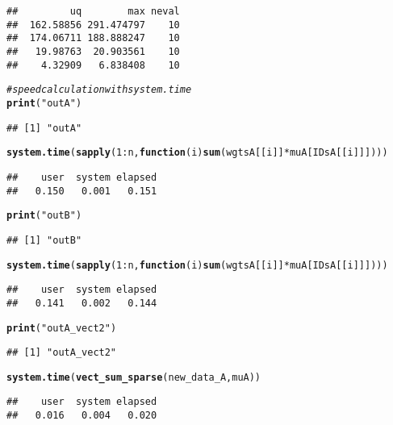 \documentclass{llncs}\usepackage[]{graphicx}\usepackage[]{color}
\makeatletter
\newcommand{\hlnum}[1]{\textcolor[rgb]{0.686,0.059,0.569}{#1}}%
\newcommand{\hlstr}[1]{\textcolor[rgb]{0.192,0.494,0.8}{#1}}%
\newcommand{\hlcom}[1]{\textcolor[rgb]{0.678,0.584,0.686}{\textit{#1}}}%
\newcommand{\hlopt}[1]{\textcolor[rgb]{0,0,0}{#1}}%
\newcommand{\hlstd}[1]{\textcolor[rgb]{0.345,0.345,0.345}{#1}}%
\newcommand{\hlkwa}[1]{\textcolor[rgb]{0.161,0.373,0.58}{\textbf{#1}}}%
\newcommand{\hlkwc}[1]{\textcolor[rgb]{0.333,0.667,0.333}{#1}}%
\newcommand{\hlkwd}[1]{\textcolor[rgb]{0.737,0.353,0.396}{\textbf{#1}}}%
\newenvironment{kframe}{%
 \def\at@end@of@kframe{}%
 \ifinner\ifhmode%
  \def\at@end@of@kframe{\end{minipage}}%
  \begin{minipage}{\columnwidth}%
 \fi\fi%
 \def\FrameCommand##1{\hskip\@totalleftmargin \hskip-\fboxsep
 \colorbox{shadecolor}{##1}\hskip-\fboxsep
     \hskip-\linewidth \hskip-\@totalleftmargin \hskip\columnwidth}%
 \MakeFramed {\advance\hsize-\width
   \@totalleftmargin\z@ \linewidth\hsize
   \@setminipage}}%
 {\par\unskip\endMakeFramed%
 \at@end@of@kframe}
\newenvironment{knitrout}{}{} %
\makeatother
\begin{document}
\begin{knitrout}
\begin{kframe}
\begin{lstlisting}[basicstyle=\ttfamily,breaklines=true]
##         uq        max neval
##  162.58856 291.474797    10
##  174.06711 188.888247    10
##   19.98763  20.903561    10
##    4.32909   6.838408    10
\end{lstlisting}
\begin{alltt}
\hlcom{# speed calculation with system.time}
\hlkwd{print}\hlstd{(}\hlstr{"outA"}\hlstd{)}
\end{alltt}
\begin{lstlisting}[basicstyle=\ttfamily,breaklines=true]
## [1] "outA"
\end{lstlisting}
\begin{alltt}
\hlkwd{system.time}\hlstd{(}\hlkwd{sapply}\hlstd{(}\hlnum{1}\hlopt{:}\hlstd{n,}\hlkwa{function}\hlstd{(}\hlkwc{i}\hlstd{)} \hlkwd{sum}\hlstd{(wgtsA[[i]]}\hlopt{*}\hlstd{muA[IDsA[[i]]])))}
\end{alltt}
\begin{lstlisting}[basicstyle=\ttfamily,breaklines=true]
##    user  system elapsed 
##   0.150   0.001   0.151
\end{lstlisting}
\begin{alltt}
\hlkwd{print}\hlstd{(}\hlstr{"outB"}\hlstd{)}
\end{alltt}
\begin{lstlisting}[basicstyle=\ttfamily,breaklines=true]
## [1] "outB"
\end{lstlisting}
\begin{alltt}
\hlkwd{system.time}\hlstd{(}\hlkwd{sapply}\hlstd{(}\hlnum{1}\hlopt{:}\hlstd{n,}\hlkwa{function}\hlstd{(}\hlkwc{i}\hlstd{)} \hlkwd{sum}\hlstd{(wgtsA[[i]]}\hlopt{*}\hlstd{muA[IDsA[[i]]])))}
\end{alltt}
\begin{lstlisting}[basicstyle=\ttfamily,breaklines=true]
##    user  system elapsed 
##   0.141   0.002   0.144
\end{lstlisting}
\begin{alltt}
\hlkwd{print}\hlstd{(}\hlstr{"outA_vect2"}\hlstd{)}
\end{alltt}
\begin{lstlisting}[basicstyle=\ttfamily,breaklines=true]
## [1] "outA_vect2"
\end{lstlisting}
\begin{alltt}
\hlkwd{system.time}\hlstd{(}\hlkwd{vect_sum_sparse}\hlstd{(new_data_A,muA))}
\end{alltt}
\begin{lstlisting}[basicstyle=\ttfamily,breaklines=true]
##    user  system elapsed 
##   0.016   0.004   0.020
\end{lstlisting}

\end{kframe}
\end{knitrout}
\end{document}
